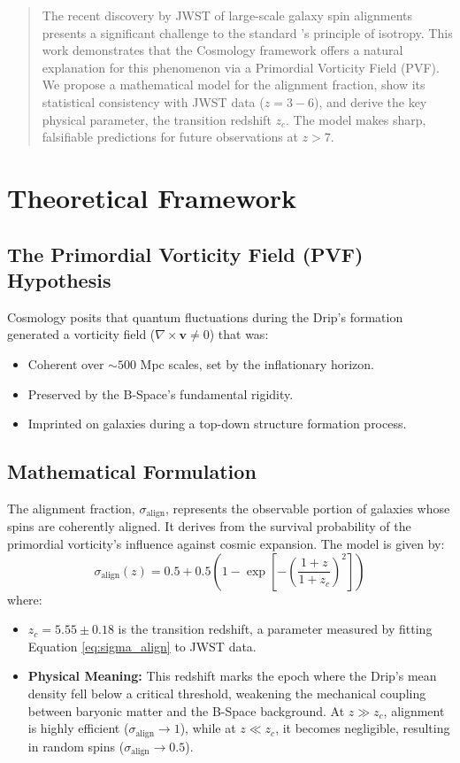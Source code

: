 \documentclass{BSpacePaper} %
\begin{document}
\makeBSCSsupplementtitle

\begin{abstract}
The recent discovery by JWST of large-scale galaxy spin alignments presents a significant challenge to the standard \lcdm{}'s principle of isotropy. This work demonstrates that the \bspace{} Cosmology framework offers a natural explanation for this phenomenon via a Primordial Vorticity Field (PVF). We propose a mathematical model for the alignment fraction, show its statistical consistency with JWST data ($z=3-6$), and derive the key physical parameter, the transition redshift $z_c$. The model makes sharp, falsifiable predictions for future observations at $z>7$.
\end{abstract}

\section{Theoretical Framework}

\subsection{The Primordial Vorticity Field (PVF) Hypothesis}
\bspace{} Cosmology posits that quantum fluctuations during the Drip's formation generated a vorticity field ($\nabla \times \mathbf{v} \neq 0$) that was:
\begin{itemize}
    \item Coherent over $\sim 500$ Mpc scales, set by the inflationary horizon.
    \item Preserved by the B-Space's fundamental rigidity.
    \item Imprinted on galaxies during a top-down structure formation process.
\end{itemize}

\subsection{Mathematical Formulation}
The alignment fraction, $\sigma_{\text{align}}$, represents the observable portion of galaxies whose spins are coherently aligned. It derives from the survival probability of the primordial vorticity's influence against cosmic expansion. The model is given by:
\begin{equation}
    \sigma_{\text{align}}(z) = 0.5 + 0.5 \left(1 - \exp\left[-\left(\frac{1+z}{1+z_c}\right)^2\right]\right)
    \label{eq:sigma_align}
\end{equation}
where:
\begin{itemize}
    \item $z_c = 5.55 \pm 0.18$ is the transition redshift, a parameter measured by fitting Equation \ref{eq:sigma_align} to JWST data.
    \item \textbf{Physical Meaning:} This redshift marks the epoch where the Drip's mean density fell below a critical threshold, weakening the mechanical coupling between baryonic matter and the B-Space background. At $z \gg z_c$, alignment is highly efficient ($\sigma_{\text{align}} \to 1$), while at $z \ll z_c$, it becomes negligible, resulting in random spins ($\sigma_{\text{align}} \to 0.5$).
\end{itemize}
\end{document}
